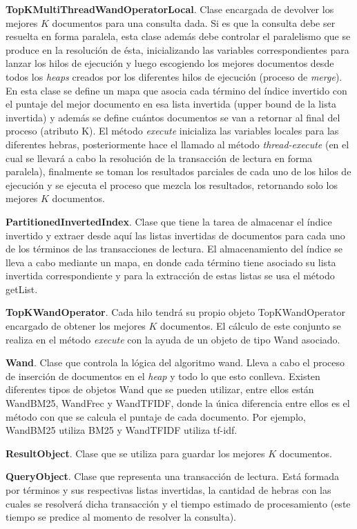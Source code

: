 \begin{list}{}{}
	\item \textbf{TopKMultiThreadWandOperatorLocal}. Clase encargada de devolver los mejores $K$ documentos para una consulta dada. Si es que la consulta debe ser resuelta en forma paralela, esta clase además debe controlar el paralelismo que se produce en la resolución de ésta, inicializando las variables correspondientes para lanzar los hilos de ejecución y luego escogiendo los mejores documentos desde todos los \textit{heaps} creados por los diferentes hilos de ejecución (proceso de \textit{merge}). En esta clase se define un mapa que asocia cada término del índice invertido con el puntaje del mejor documento en esa lista invertida (upper bound de la lista invertida) y además se define cuántos documentos se van a retornar al final del proceso (atributo K). El método \textit{execute} inicializa las variables locales para las diferentes hebras, posteriormente hace el llamado al método \emph{thread-execute} (en el cual se llevará a cabo la resolución de la transacción de lectura en forma paralela), finalmente se toman los resultados parciales de cada uno de los hilos de ejecución y se ejecuta el proceso que mezcla los resultados, retornando solo los mejores $K$ documentos. 
	
	\item \textbf{PartitionedInvertedIndex}. Clase que tiene la tarea de almacenar el índice invertido y extraer desde aquí las listas invertidas de documentos para cada uno de los términos de las transacciones de lectura. El almacenamiento del índice se lleva a cabo mediante un mapa, en donde cada término tiene asociado su lista invertida correspondiente y para la extracción de estas listas se usa el método getList.
	
	\item \textbf{TopKWandOperator}. Cada hilo tendrá su propio objeto TopKWandOperator encargado de obtener los mejores $K$ documentos. El cálculo de este conjunto se realiza en el método \textit{execute} con la ayuda de un objeto de tipo Wand asociado.
	
	\item \textbf{Wand}. Clase que controla la lógica del algoritmo wand. Lleva a cabo el proceso de inserción de documentos en el \textit{heap} y todo lo que esto conlleva. Existen diferentes tipos de objetos Wand que se pueden utilizar, entre ellos están WandBM25, WandFrec y WandTFIDF, donde la única diferencia entre ellos es el método con que se calcula el puntaje de cada documento. Por ejemplo, WandBM25 utiliza BM25 y WandTFIDF utiliza tf-idf. 
	
	\item \textbf{ResultObject}. Clase que se utiliza para guardar los mejores $K$ documentos.
	
	\item \textbf{QueryObject}. Clase que representa una transacción de lectura. Está formada por términos y sus respectivas listas invertidas, la cantidad de hebras con las cuales se resolverá dicha transacción y el tiempo estimado de procesamiento (este tiempo se predice al momento de resolver la consulta).

\end{list}


